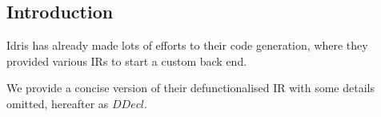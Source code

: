 \documentclass[a1,portrait]{a1poster}
\begin{document}
\begin{multicols}{2}
\color{OrangeRed} %

\section*{Introduction}

Idris has already made lots of efforts to their code generation, where
they provided various IRs \cite{brady2015cross} to start a custom back end.

We provide a concise version of their defunctionalised IR with some details omitted, hereafter as $DDecl$.

\begin{multicols}{2}

\begin{minipage}[b]{0.8\linewidth}
\begin{bnf*}
    \\
    \\
    \\
    \\
    \\
    \\
    \\
    \\
    \\
    \\
    \\
    \\
\end{bnf*}
\end{minipage}


\end{multicols}
\end{multicols}
\end{document}
